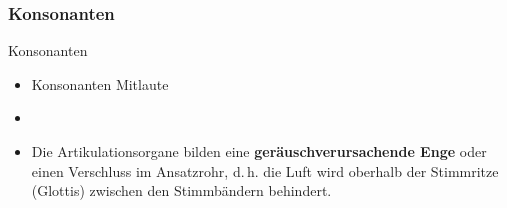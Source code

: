 %
\subsubsection{Konsonanten}

\begin{frame}{Konsonanten}

	\begin{itemize}
		\item Konsonanten \ras Mitlaute
		\item[]
		\item Die Artikulationsorgane bilden eine \textbf{geräuschverursachende Enge} oder einen Verschluss im Ansatzrohr, d.\,h. die Luft wird oberhalb der Stimmritze (Glottis) zwischen den Stimmbändern behindert.
	\end{itemize}
	
\end{frame}



